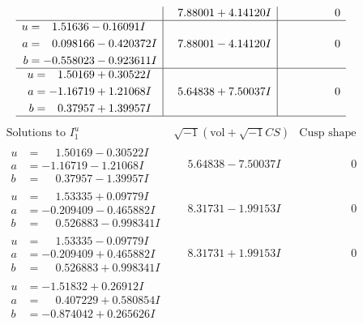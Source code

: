 \documentclass[1p]{elsarticle_modified}
\theoremstyle{definition}
\newcommand{\I}{\sqrt{-1}}
\begin{document}
$$\begin{array}{c|c|c}
 & \phantom{-}7.88001 + 4.14120 I & \phantom{-0.000000 } 0 \\ \hline\begin{aligned}
u &= \phantom{-}1.51636 - 0.16091 I \\
a &= \phantom{-}0.098166 - 0.420372 I \\
b &= -0.558023 - 0.923611 I\end{aligned}
 & \phantom{-}7.88001 - 4.14120 I & \phantom{-0.000000 } 0 \\ \hline\begin{aligned}
u &= \phantom{-}1.50169 + 0.30522 I \\
a &= -1.16719 + 1.21068 I \\
b &= \phantom{-}0.37957 + 1.39957 I\end{aligned}
 & \phantom{-}5.64838 + 7.50037 I & \phantom{-0.000000 } 0\\
 \hline 
 \end{array}$$\newpage$$\begin{array}{c|c|c}  
\text{Solutions to }I^u_{1}& \I (\text{vol} + \sqrt{-1}CS) & \text{Cusp shape}\\
 \hline 
\begin{aligned}
u &= \phantom{-}1.50169 - 0.30522 I \\
a &= -1.16719 - 1.21068 I \\
b &= \phantom{-}0.37957 - 1.39957 I\end{aligned}
 & \phantom{-}5.64838 - 7.50037 I & \phantom{-0.000000 } 0 \\ \hline\begin{aligned}
u &= \phantom{-}1.53335 + 0.09779 I \\
a &= -0.209409 - 0.465882 I \\
b &= \phantom{-}0.526883 - 0.998341 I\end{aligned}
 & \phantom{-}8.31731 - 1.99153 I & \phantom{-0.000000 } 0 \\ \hline\begin{aligned}
u &= \phantom{-}1.53335 - 0.09779 I \\
a &= -0.209409 + 0.465882 I \\
b &= \phantom{-}0.526883 + 0.998341 I\end{aligned}
 & \phantom{-}8.31731 + 1.99153 I & \phantom{-0.000000 } 0 \\ \hline\begin{aligned}
u &= -1.51832 + 0.26912 I \\
a &= \phantom{-}0.407229 + 0.580854 I \\
b &= -0.874042 + 0.265626 I\end{aligned}

\end{array}$$
\end{document}
